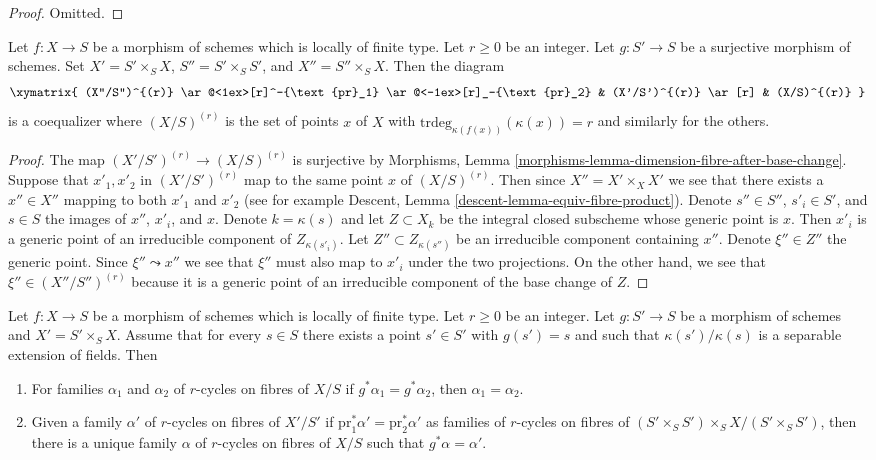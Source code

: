 \begin{proof}
Omitted.
\end{proof}

\begin{lemma}
\label{lemma-coequalizer-dim-r}
Let $f : X \to S$ be a morphism of schemes which is locally of finite type.
Let $r \geq 0$ be an integer. Let $g : S' \to S$ be a surjective morphism of
schemes. Set $X' = S' \times_S X$, $S'' = S' \times_S S'$, and
$X'' =  S'' \times_S X$. Then the diagram
$$
\xymatrix{
(X''/S'')^{(r)}
\ar@<1ex>[r]^-{\text{pr}_1} \ar@<-1ex>[r]_-{\text{pr}_2} &
(X'/S')^{(r)} \ar[r] &
(X/S)^{(r)}
}
$$
is a coequalizer where $(X/S)^{(r)}$ is the set of points $x$ of $X$
with $\text{trdeg}_{\kappa(f(x))}(\kappa(x)) = r$ and similarly for
the others.
\end{lemma}

\begin{proof}
The map $(X'/S')^{(r)} \to (X/S)^{(r)}$ is surjective by
Morphisms, Lemma \ref{morphisms-lemma-dimension-fibre-after-base-change}.
Suppose that $x'_1, x'_2$ in $(X'/S')^{(r)}$ map to the same point $x$
of $(X/S)^{(r)}$. Then since $X'' = X' \times_X X'$ we see that there
exists a $x'' \in X''$ mapping to both $x'_1$ and $x'_2$ (see for
example Descent, Lemma \ref{descent-lemma-equiv-fibre-product}).
Denote $s'' \in S''$, $s'_i \in S'$, and $s \in S$ the images
of $x''$, $x'_i$, and $x$.
Denote $k = \kappa(s)$ and let $Z \subset X_k$ be the integral
closed subscheme whose generic point is $x$. Then $x'_i$
is a generic point of an irreducible component of $Z_{\kappa(s'_i)}$.
Let $Z'' \subset Z_{\kappa(s'')}$ be an irreducible component
containing $x''$. Denote $\xi'' \in Z''$ the generic point.
Since $\xi'' \leadsto x''$ we see that $\xi''$ must also
map to $x'_i$ under the two projections. On the other hand,
we see that $\xi'' \in (X''/S'')^{(r)}$ because it is a generic
point of an irreducible component of the base change of $Z$.
\end{proof}

\begin{lemma}
\label{lemma-descend-family}
Let $f : X \to S$ be a morphism of schemes which is locally of finite type.
Let $r \geq 0$ be an integer. Let $g : S' \to S$ be a morphism of
schemes and $X' = S' \times_S X$. Assume that for every $s \in S$ there
exists a point $s' \in S'$ with $g(s') = s$ and such that
$\kappa(s')/\kappa(s)$ is a separable extension of fields. Then
\begin{enumerate}
\item For families $\alpha_1$ and $\alpha_2$ of $r$-cycles on fibres of $X/S$
if $g^*\alpha_1 = g^*\alpha_2$, then $\alpha_1 = \alpha_2$.
\item Given a family $\alpha'$ of $r$-cycles on fibres of $X'/S'$ if
$\text{pr}_1^*\alpha' = \text{pr}_2^*\alpha'$ as families of
$r$-cycles on fibres of $(S' \times_S S') \times_S X / (S' \times_S S')$,
then there is a unique family $\alpha$ of $r$-cycles on fibres of $X/S$
such that $g^*\alpha = \alpha'$.
\end{enumerate}
\end{lemma}

